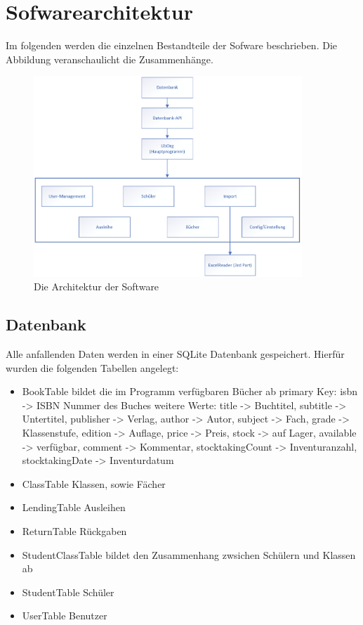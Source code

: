 \section{Sofwarearchitektur}
Im folgenden werden die einzelnen Bestandteile der Sofware beschrieben. Die Abbildung veranschaulicht die Zusammenhänge. 
\begin{figure}[htb]
	\centering
		\includegraphics[width=0.90\textwidth]{figures/architecture.png}
	\caption{Die Architektur der Software}
	\label{fig:Architektur}
\end{figure}

\subsection{Datenbank}
Alle anfallenden Daten werden in einer SQLite Datenbank gespeichert. Hierfür wurden die folgenden Tabellen angelegt:
\begin{itemize}
\item BookTable \newline
bildet die im Programm verfügbaren Bücher ab \newline
primary Key: isbn -> ISBN Nummer des Buches \newline
weitere Werte: title -> Buchtitel, subtitle -> Untertitel, publisher -> Verlag, author -> Autor, subject -> Fach, grade -> Klassenstufe, edition -> Auflage, price -> Preis, stock -> auf Lager, available -> verfügbar, comment -> Kommentar, stocktakingCount -> Inventuranzahl, stocktakingDate -> Inventurdatum
\item ClassTable \newline
Klassen, sowie Fächer
\item LendingTable \newline 
Ausleihen 
\item ReturnTable \newline
Rückgaben
\item StudentClassTable \newline 
bildet den Zusammenhang zwsichen Schülern und Klassen ab 
\item StudentTable  \newline
Schüler 
\item UserTable  \newline
Benutzer 
\end{itemize} 
 

